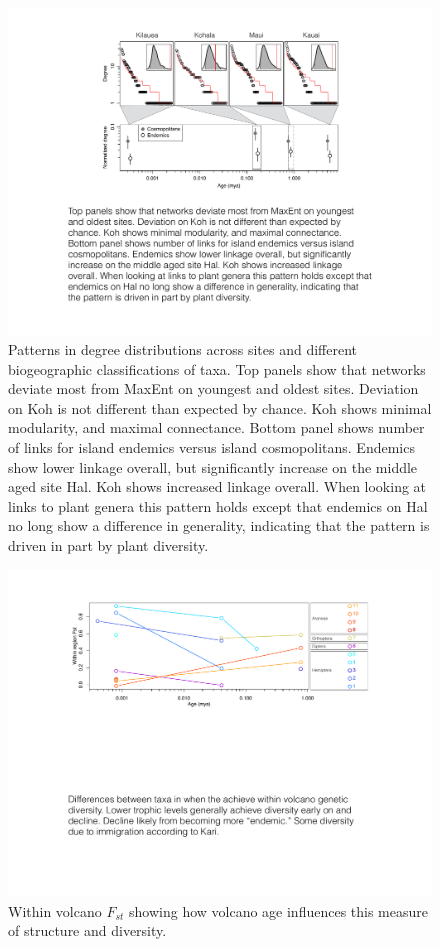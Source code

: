 \documentclass[12pt]{article}
\begin{document}
\begin{figure}[!hp]
  \centering
  \includegraphics[scale=0.7]{fig_degree.pdf} 
  \caption{Patterns in degree distributions across sites and different
    biogeographic classifications of taxa. Top panels show that
    networks deviate most from MaxEnt on youngest and oldest
    sites. Deviation on Koh is not different than expected by
    chance. Koh shows minimal modularity, and maximal
    connectance. Bottom panel shows number of links for island
    endemics versus island cosmopolitans. Endemics show lower linkage
    overall, but significantly increase on the middle aged site
    Hal. Koh shows increased linkage overall. When looking at links to
    plant genera this pattern holds except that endemics on Hal no
    long show a difference in generality, indicating that the pattern
    is driven in part by plant diversity.}
  \label{fig:degree}
\end{figure}

\begin{figure}[!hp]
  \centering
  \includegraphics[scale=0.6]{fig_volcanoFst.pdf}
  \caption{Within volcano $F_{st}$ showing how volcano age influences
    this measure of structure and diversity.}
  \label{fig:volcanoFst}
\end{figure}
\end{document}
